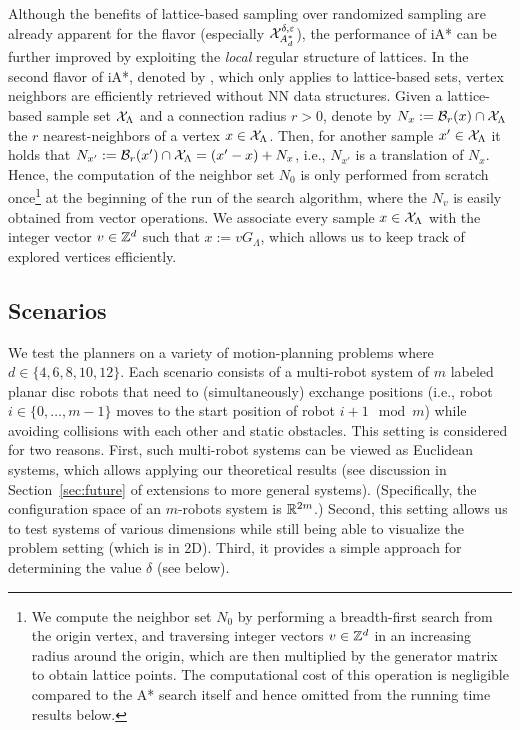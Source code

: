 Although the benefits of lattice-based sampling over randomized sampling are already apparent for the \glo flavor (especially $\mathcal{X}_{A_d^*}^{\delta,\varepsilon}$), the performance of iA* can be further improved by exploiting the \emph{local} regular structure of lattices. In the second flavor of iA*, denoted by \loc,  which only applies to lattice-based sets, vertex neighbors are efficiently retrieved without NN data structures. Given a lattice-based sample set $\mathcal{X}_\Lambda$ and a connection radius $r>0$, denote by $N_x:=\mathcal{B}_r(x)\cap \mathcal{X}_\Lambda$ the $r$ nearest-neighbors of a vertex $x\in \mathcal{X}_\Lambda$. Then, for another sample $x'\in \mathcal{X}_\Lambda$ it holds that $N_{x'}:=\mathcal{B}_r(x')\cap \mathcal{X}_\Lambda=(x'-x)+N_x$, i.e., $N_{x'}$ is a translation of $N_x$. Hence, the computation of the neighbor set $N_0$ is only performed from scratch once\footnote{We compute the neighbor set $N_0$ by performing a breadth-first search from the origin vertex, and traversing integer vectors $v\in \mathbb{Z}^d$ in an increasing radius around the origin, which are then multiplied by the generator matrix to obtain lattice points. The computational cost of this operation is negligible compared to the  A* search itself and hence omitted from the running time results below.} at the beginning of the run of the search algorithm, where the $N_v$ is easily obtained from vector operations.
We associate every sample $x\in \mathcal{X}_\Lambda$ with the integer vector $v\in \mathbb{Z}^d$ such that $x:=vG_\Lambda$, which allows us to keep track of explored vertices efficiently. 

\subsection{Scenarios}
We test the planners on a variety of motion-planning problems where $d\in \{4,6,8,10,12\}$. Each scenario consists of a multi-robot system of $m$ labeled planar disc robots that need to (simultaneously) exchange positions (i.e., robot $i\in \{0,\ldots,m-1\}$ moves to the start position of robot $i+1 \mod m$) while avoiding collisions with each other and static obstacles. This setting is considered for two reasons. First, such multi-robot systems can be viewed as Euclidean systems, which allows applying our theoretical results (see discussion in Section~\ref{sec:future} of extensions to more general systems). (Specifically, the configuration space of an $m$-robots system is $\mathbb{R}^{2m}$.) Second, this setting allows us to test systems of various dimensions while still being able to visualize the problem setting (which is in 2D).  Third, it provides a simple approach for determining the value $\delta$ (see below).

